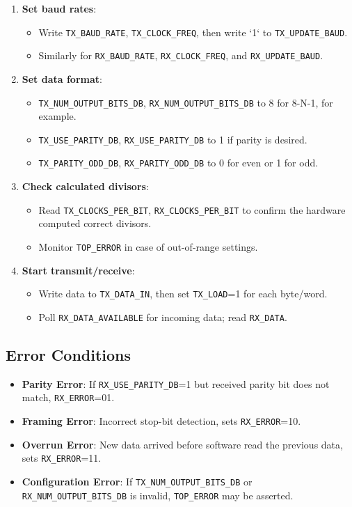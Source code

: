\begin{enumerate}[noitemsep]
  \item \textbf{Set baud rates}:
  \begin{itemize}[noitemsep]
    \item Write \texttt{TX\_BAUD\_RATE}, \texttt{TX\_CLOCK\_FREQ}, then write `1` to \texttt{TX\_UPDATE\_BAUD}.
    \item Similarly for \texttt{RX\_BAUD\_RATE}, \texttt{RX\_CLOCK\_FREQ}, and \texttt{RX\_UPDATE\_BAUD}.
  \end{itemize}

  \item \textbf{Set data format}:
  \begin{itemize}[noitemsep]
    \item \texttt{TX\_NUM\_OUTPUT\_BITS\_DB}, \texttt{RX\_NUM\_OUTPUT\_BITS\_DB} to 8 for 8-N-1, for example.
    \item \texttt{TX\_USE\_PARITY\_DB}, \texttt{RX\_USE\_PARITY\_DB} to 1 if parity is desired.
    \item \texttt{TX\_PARITY\_ODD\_DB}, \texttt{RX\_PARITY\_ODD\_DB} to 0 for even or 1 for odd.
  \end{itemize}

  \item \textbf{Check calculated divisors}:
  \begin{itemize}[noitemsep]
    \item Read \texttt{TX\_CLOCKS\_PER\_BIT}, \texttt{RX\_CLOCKS\_PER\_BIT} to confirm the hardware computed correct divisors.
    \item Monitor \texttt{TOP\_ERROR} in case of out-of-range settings.
  \end{itemize}

  \item \textbf{Start transmit/receive}:
  \begin{itemize}[noitemsep]
    \item Write data to \texttt{TX\_DATA\_IN}, then set \texttt{TX\_LOAD}=1 for each byte/word.
    \item Poll \texttt{RX\_DATA\_AVAILABLE} for incoming data; read \texttt{RX\_DATA}.
  \end{itemize}
\end{enumerate}

\subsection{Error Conditions}
\begin{itemize}[noitemsep]
\item \textbf{Parity Error}: If \texttt{RX\_USE\_PARITY\_DB}=1 but received parity bit does not match, \texttt{RX\_ERROR}=01.
\item \textbf{Framing Error}: Incorrect stop-bit detection, sets \texttt{RX\_ERROR}=10.
\item \textbf{Overrun Error}: New data arrived before software read the previous data, sets \texttt{RX\_ERROR}=11.
\item \textbf{Configuration Error}: If \texttt{TX\_NUM\_OUTPUT\_BITS\_DB} or \texttt{RX\_NUM\_OUTPUT\_BITS\_DB} is invalid, \texttt{TOP\_ERROR} may be asserted.
\end{itemize}
